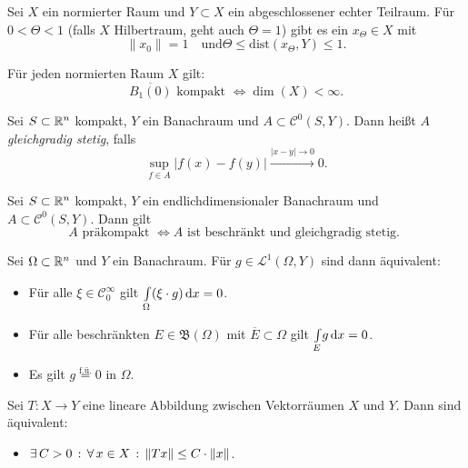 \documentclass{cheat-sheet}
\newcommand{\Bor}{\mathfrak{B}} %
\newcommand{\Leb}{\mathcal{L}} %
\newcommand{\fue}{\overset{\text{f.ü.}}} %
\newcommand{\dist}{\mathrm{dist}} %
\begin{document}
\begin{satz}
  Sei $X$ ein normierter Raum und $Y \subset X$ ein abgeschlossener echter Teilraum. Für $0 < \Theta < 1$ (falls $X$ Hilbertraum, geht auch $\Theta = 1$) gibt es ein $x_{\Theta} \in X$ mit
  \[ \|x_0\| = 1 \quad \text{und} \Theta \leq \dist(x_{\Theta}, Y) \leq 1. \]
\end{satz}

\begin{satz}
  Für jeden normierten Raum $X$ gilt:
  \[ \overline{B_1(0)} \text{ kompakt } \iff \dim(X) < \infty. \]
\end{satz}

\begin{defn}
  Sei $S \subset \mathbb{R}^n$ kompakt, $Y$ ein Banachraum und $A \subset \mathcal{C}^0(S, Y)$. Dann heißt $A$ \emph{gleichgradig stetig}, falls
  \[ \sup_{f \in A} \left| f(x) - f(y) \right| \xrightarrow{\left| x - y \right| \to 0} 0. \]
\end{defn}

\begin{defn}
  Sei $S \subset \mathbb{R}^n$ kompakt, $Y$ ein endlichdimensionaler Banachraum und $A \subset \mathcal{C}^0(S, Y)$. Dann gilt
  \[ A \text{ präkompakt } \iff A \text{ ist beschränkt und gleichgradig stetig. } \]
\end{defn}

\begin{satz}
  Sei $\Omega \subset \mathbb{R}^n$ und $Y$ ein Banachraum. Für $g \in \Leb^1(\Omega, Y)$ sind dann äquivalent:
  \begin{itemize}
    \item Für alle $\xi \in \mathcal{C}_0^\infty$ gilt ${\textstyle \int\limits_{\Omega}^{}} (\xi \cdot g) \,\mathrm{d} x = 0$.
    \item Für alle beschränkten $E \in \Bor(\Omega)$ mit $\overline{E} \subset \Omega$ gilt ${\textstyle \int\limits_{E}^{}} g \,\mathrm{d} x = 0$.
    \item Es gilt $g \fue= 0$ in $\Omega$.
  \end{itemize}
\end{satz}

\begin{satz}
  Sei $T : X \to Y$ eine lineare Abbildung zwischen Vektorräumen $X$ und $Y$. Dann sind äquivalent:
  \begin{itemize}
    \item $\exists \, {C > 0} \,:\, \forall \, {x \in X} \,:\, \|Tx\| \leq C \cdot \|x\|$.
  \end{itemize}
\end{satz}
\end{document}

